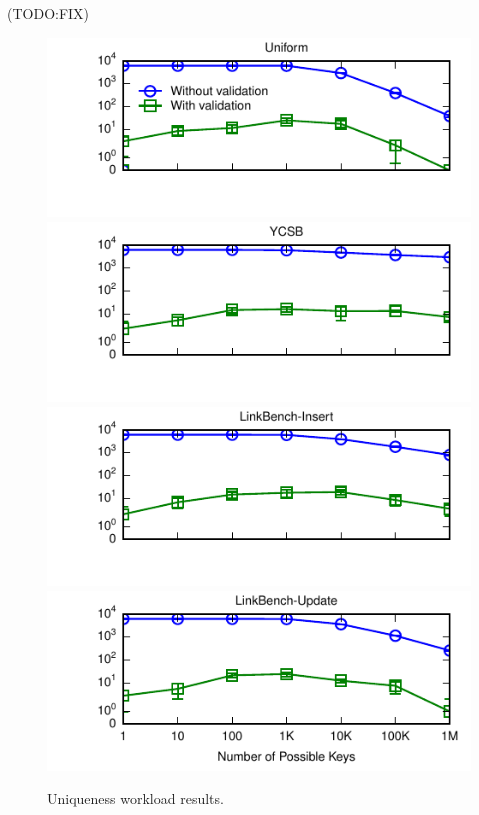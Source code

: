 (TODO:FIX)

\begin{figure}
\includegraphics[width=\columnwidth]{figs/pk-workload-uniform-violations.pdf}\vspace{-2em}
\includegraphics[width=\columnwidth]{figs/pk-workload-ycsb-violations.pdf}\vspace{-2em}
\includegraphics[width=\columnwidth]{figs/pk-workload-linkbench-ins-violations.pdf}\vspace{-2em}
\includegraphics[width=\columnwidth]{figs/pk-workload-linkbench-upd-violations.pdf}\vspace{-1em}
\caption{Uniqueness workload results.}
\label{fig:pk-workload}
\end{figure}

